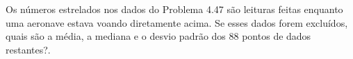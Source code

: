 Os números estrelados nos dados do Problema 4.47 são leituras feitas enquanto uma aeronave estava voando diretamente acima. Se esses dados forem excluídos, quais são a média, a mediana e o desvio padrão dos 88 pontos de dados restantes?.

